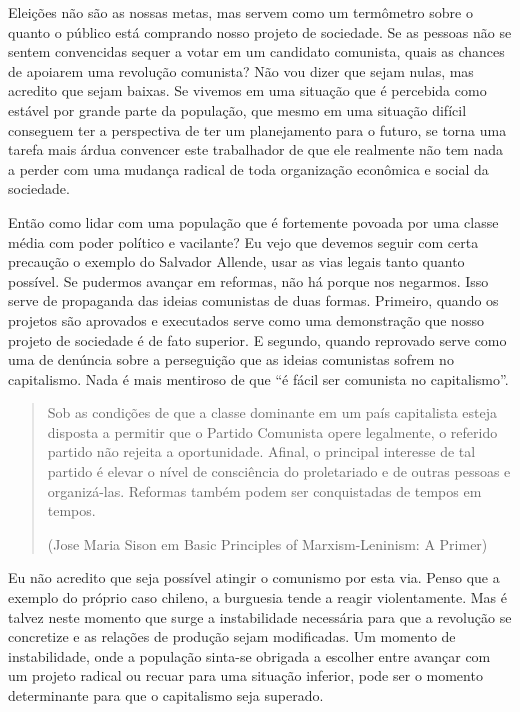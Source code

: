 Eleições não são as nossas metas, mas servem como um termômetro sobre o quanto o público está comprando nosso projeto de sociedade. Se as pessoas não se sentem convencidas sequer a votar em um candidato comunista, quais as chances de apoiarem uma revolução comunista? Não vou dizer que sejam nulas, mas acredito que sejam baixas. Se vivemos em uma situação que é percebida como estável por grande parte da população, que mesmo em uma situação difícil conseguem ter a perspectiva de ter um planejamento para o futuro, se torna uma tarefa mais árdua convencer este trabalhador de que ele realmente não tem nada a perder com uma mudança radical de toda organização econômica e social da sociedade.

Então como lidar com uma população que é fortemente povoada por uma classe média com poder político e vacilante? Eu vejo que devemos seguir com certa precaução o exemplo do Salvador Allende, usar as vias legais tanto quanto possível. Se pudermos avançar em reformas, não há porque nos negarmos. Isso serve de propaganda das ideias comunistas de duas formas. Primeiro, quando os projetos são aprovados e executados serve como uma demonstração que nosso projeto de sociedade é de fato superior. E segundo, quando reprovado serve como uma de denúncia sobre a perseguição que as ideias comunistas sofrem no capitalismo. Nada é mais mentiroso de que “é fácil ser comunista no capitalismo”.

\begin{quote}
Sob as condições de que a classe dominante em um país capitalista esteja disposta a permitir que o Partido Comunista opere legalmente, o referido partido não rejeita a oportunidade. Afinal, o principal interesse de tal partido é elevar o nível de consciência do proletariado e de outras pessoas e organizá-las. Reformas também podem ser conquistadas de tempos em tempos.

(Jose Maria Sison em Basic Principles of Marxism-Leninism: A Primer)
\end{quote}

Eu não acredito que seja possível atingir o comunismo por esta via. Penso que a exemplo do próprio caso chileno, a burguesia tende a reagir violentamente. Mas é talvez neste momento que surge a instabilidade necessária para que a revolução se concretize e as relações de produção sejam modificadas. Um momento de instabilidade, onde a população sinta-se obrigada a escolher entre avançar com um projeto radical ou recuar para uma situação inferior, pode ser o momento determinante para que o capitalismo seja superado.

